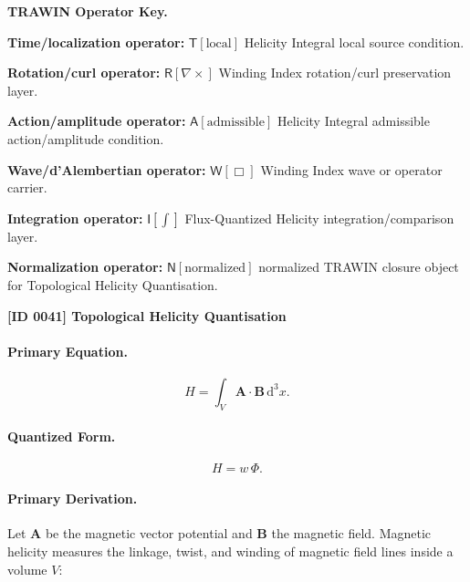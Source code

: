\par\vspace{0.45\baselineskip}
\noindent\begin{minipage}[t]{\linewidth}
\begingroup
\small
\raggedright
\textbf{TRAWIN Operator Key.}\par
\noindent\textbf{Time/localization operator:} $\mathsf{T}\!\left[\mathrm{local}\right]$ Helicity Integral local source condition.\par
\noindent\textbf{Rotation/curl operator:} $\mathsf{R}\!\left[\nabla\times\right]$ Winding Index rotation/curl preservation layer.\par
\noindent\textbf{Action/amplitude operator:} $\mathsf{A}\!\left[\mathrm{admissible}\right]$ Helicity Integral admissible action/amplitude condition.\par
\noindent\textbf{Wave/d'Alembertian operator:} $\mathsf{W}\!\left[\Box\right]$ Winding Index wave or operator carrier.\par
\noindent\textbf{Integration operator:} $\mathsf{I}\!\left[\int\right]$ Flux-Quantized Helicity integration/comparison layer.\par
\noindent\textbf{Normalization operator:} $\mathsf{N}\!\left[\mathrm{normalized}\right]$ normalized TRAWIN closure object for Topological Helicity Quantisation.\par
\endgroup
\end{minipage}

\clearpage
\noindent\textbf{[ID 0041] Topological Helicity Quantisation}\par
\vspace{0.35em}
\paragraph{Primary Equation.}
\begin{equation}
H
=
\int_V
\mathbf{A}\cdot\mathbf{B}
\,\mathrm{d}^3x .
\end{equation}

\paragraph{Quantized Form.}
\begin{equation}
H=w\,\Phi .
\end{equation}

\paragraph{Primary Derivation.}
Let $\mathbf{A}$ be the magnetic vector potential and $\mathbf{B}$ the magnetic field.  
Magnetic helicity measures the linkage, twist, and winding of magnetic field lines inside a volume $V$:

